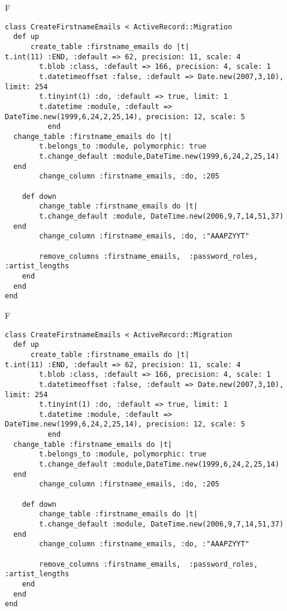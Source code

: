 F
\begin{verbatim}
class CreateFirstnameEmails < ActiveRecord::Migration
  def up
	  create_table :firstname_emails do |t|
t.int(11) :END, :default => 62, precision: 11, scale: 4
		t.blob :class, :default => 166, precision: 4, scale: 1
		t.datetimeoffset :false, :default => Date.new(2007,3,10), limit: 254
		t.tinyint(1) :do, :default => true, limit: 1
		t.datetime :module, :default => DateTime.new(1999,6,24,2,25,14), precision: 12, scale: 5
		  end
  change_table :firstname_emails do |t|
		t.belongs_to :module, polymorphic: true
 		t.change_default :module,DateTime.new(1999,6,24,2,25,14)
  end
 		change_column :firstname_emails, :do, :205
   
	def down
		change_table :firstname_emails do |t|
		t.change_default :module, DateTime.new(2006,9,7,14,51,37)
  end
 		change_column :firstname_emails, :do, :"AAAPZYYT"
   
		remove_columns :firstname_emails,  :password_roles, :artist_lengths 
    end 
  end
end

\end{verbatim}

F
\begin{verbatim}
class CreateFirstnameEmails < ActiveRecord::Migration
  def up
	  create_table :firstname_emails do |t|
t.int(11) :END, :default => 62, precision: 11, scale: 4
		t.blob :class, :default => 166, precision: 4, scale: 1
		t.datetimeoffset :false, :default => Date.new(2007,3,10), limit: 254
		t.tinyint(1) :do, :default => true, limit: 1
		t.datetime :module, :default => DateTime.new(1999,6,24,2,25,14), precision: 12, scale: 5
		  end
  change_table :firstname_emails do |t|
		t.belongs_to :module, polymorphic: true
 		t.change_default :module,DateTime.new(1999,6,24,2,25,14)
  end
 		change_column :firstname_emails, :do, :205
   
	def down
		change_table :firstname_emails do |t|
		t.change_default :module, DateTime.new(2006,9,7,14,51,37)
  end
 		change_column :firstname_emails, :do, :"AAAPZYYT"
   
		remove_columns :firstname_emails,  :password_roles, :artist_lengths 
    end 
  end
end

\end{verbatim}

